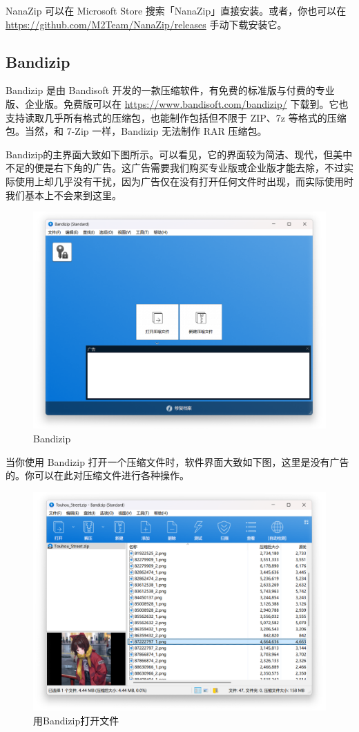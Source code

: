 {NanaZip 可以在 Microsoft Store 搜索「NanaZip」直接安装。或者，你也可以在 \url{https://github.com/M2Team/NanaZip/releases} 手动下载安装它。

\subsection{Bandizip}

Bandizip 是由 Bandisoft 开发的一款压缩软件，有免费的标准版与付费的专业版、企业版。免费版可以在 \url{https://www.bandisoft.com/bandizip/} 下载到。它也支持读取几乎所有格式的压缩包，也能制作包括但不限于 ZIP、7z 等格式的压缩包。当然，和 7-Zip 一样，Bandizip 无法制作 RAR 压缩包。

Bandizip的主界面大致如下图所示。可以看见，它的界面较为简洁、现代，但美中不足的便是右下角的广告。这广告需要我们购买专业版或企业版才能去除，不过实际使用上却几乎没有干扰，因为广告仅在没有打开任何文件时出现，而实际使用时我们基本上不会来到这里。

\begin{figure}[htb!]
  \centering
  \includegraphics[width=.65\textwidth]{assets/software/Bandizip_main_window.png}
  \caption{Bandizip}
  \label{fig:Bandizip_main_window}
\end{figure}

当你使用 Bandizip 打开一个压缩文件时，软件界面大致如下图，这里是没有广告的。你可以在此对压缩文件进行各种操作。

\begin{figure}[htb!]
  \centering
  \includegraphics[width=.65\textwidth]{assets/software/Bandizip_opening_archive.png}
  \caption{用Bandizip打开文件}
  \label{fig:Bandizip_opening_archive}
\end{figure}

}
